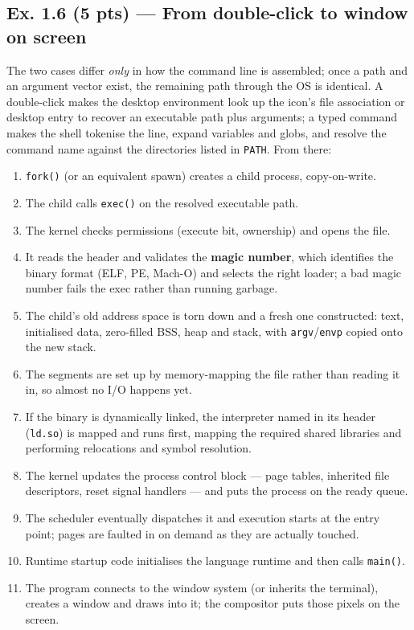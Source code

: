 \subsection*{Ex. 1.6 (5 pts) --- From double-click to window on screen}
\label{p2:sec:launch}

The two cases differ \emph{only} in how the command line is assembled; once a path and an
argument vector exist, the remaining path through the OS is identical. A double-click
makes the desktop environment look up the icon's file association or desktop entry to
recover an executable path plus arguments; a typed command makes the shell tokenise the
line, expand variables and globs, and resolve the command name against the directories
listed in \texttt{PATH}.
From there:

\begin{enumerate}[itemsep=0pt, topsep=3pt]
  \item \texttt{fork()} (or an equivalent spawn) creates a child process, copy-on-write.
  \item The child calls \texttt{exec()} on the resolved executable path.
  \item The kernel checks permissions (execute bit, ownership) and opens the file.
  \item It reads the header and validates the \textbf{magic number}, which identifies the
        binary format (ELF, PE, Mach-O) and selects the right loader; a bad magic number
        fails the exec rather than running garbage.
  \item The child's old address space is torn down and a fresh one constructed: text,
        initialised data, zero-filled BSS, heap and stack, with \texttt{argv}/\texttt{envp}
        copied onto the new stack.
  \item The segments are set up by memory-mapping the file rather than reading it in, so
        almost no I/O happens yet.
  \item If the binary is dynamically linked, the interpreter named in its header
        (\texttt{ld.so}) is mapped and runs first, mapping the required shared libraries
        and performing relocations and symbol resolution.
  \item The kernel updates the process control block --- page tables, inherited file
        descriptors, reset signal handlers --- and puts the process on the ready queue.
  \item The scheduler eventually dispatches it and execution starts at the entry point;
        pages are faulted in on demand as they are actually touched.
  \item Runtime startup code initialises the language runtime and then calls
        \texttt{main()}.
  \item The program connects to the window system (or inherits the terminal), creates a
        window and draws into it; the compositor puts those pixels on the screen.
\end{enumerate}

